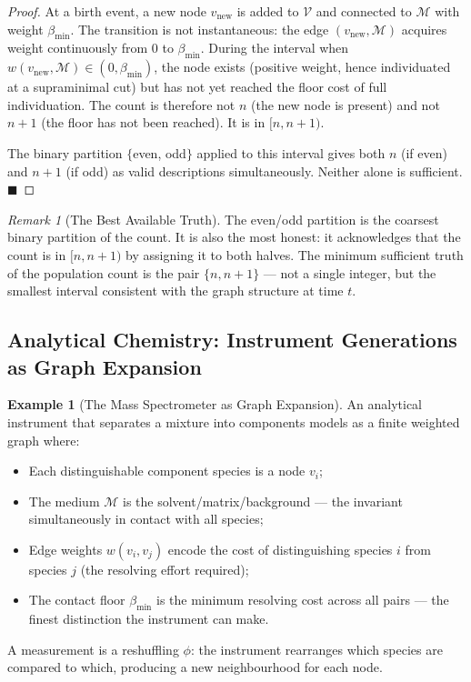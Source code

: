 \documentclass[12pt, a4paper]{article}
\theoremstyle{plain}
\theoremstyle{definition}
\newtheorem{example}[theorem]{Example}
\theoremstyle{remark}
\newtheorem{remark}[theorem]{Remark}
\newcommand{\med}{\mathcal{M}}
\newcommand{\Vcal}{\mathcal{V}}
\newcommand{\bmin}{\beta_{\min}}
\newcommand{\qed}{\hfill$\blacksquare$}
\begin{document}
\begin{proof}
At a birth event, a new node $v_{\mathrm{new}}$ is added to $\Vcal$ and
connected to $\med$ with weight $\bmin$. The transition is not instantaneous:
the edge $(v_{\mathrm{new}}, \med)$ acquires weight continuously from $0$ to
$\bmin$. During the interval when $w(v_{\mathrm{new}}, \med) \in (0, \bmin)$,
the node exists (positive weight, hence individuated at a supraminimal cut)
but has not yet reached the floor cost of full individuation. The count is
therefore not $n$ (the new node is present) and not $n+1$ (the floor has not
been reached). It is in $[n, n+1)$.

The binary partition $\{$even, odd$\}$ applied to this interval gives both
$n$ (if even) and $n+1$ (if odd) as valid descriptions simultaneously.
Neither alone is sufficient. \qed
\end{proof}

\begin{remark}[The Best Available Truth]
\label{rem:count_truth}
The even/odd partition is the coarsest binary partition of the count. It is
also the most honest: it acknowledges that the count is in $[n, n+1)$ by
assigning it to both halves. The minimum sufficient truth of the population
count is the pair $\{n, n+1\}$ --- not a single integer, but the smallest
interval consistent with the graph structure at time $t$.
\end{remark}

\subsection{Analytical Chemistry: Instrument Generations as Graph Expansion}

\begin{example}[The Mass Spectrometer as Graph Expansion]
\label{ex:ms}
An analytical instrument that separates a mixture into components models as
a finite weighted graph where:
\begin{itemize}
  \item Each distinguishable component species is a node $v_i$;
  \item The medium $\med$ is the solvent/matrix/background --- the invariant
  simultaneously in contact with all species;
  \item Edge weights $w(v_i, v_j)$ encode the cost of distinguishing species
  $i$ from species $j$ (the resolving effort required);
  \item The contact floor $\bmin$ is the minimum resolving cost across all
  pairs --- the finest distinction the instrument can make.
\end{itemize}

A measurement is a reshuffling $\phi$: the instrument rearranges which species
are compared to which, producing a new neighbourhood for each node.
\end{example}
\end{document}
